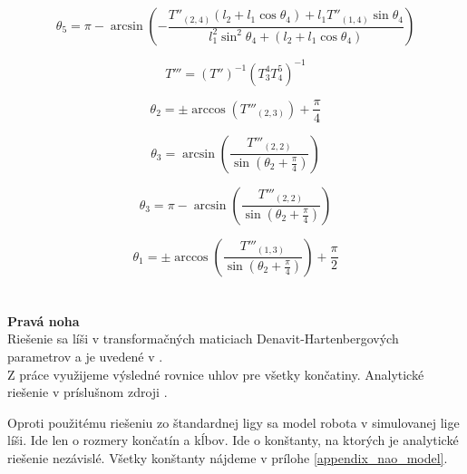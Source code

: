 \begin{equation}
	\theta_5 = \pi - \arcsin\left(-\frac{T''_{\left(2,4\right)} \left(l_2 + l_1\cos\theta_4\right) + l_1T''_{\left(1,4\right)}\sin\theta_4 } {l_1^2\sin^2 \theta_4 + \left(l_2 + l_1\cos\theta_4\right) }\right)
\end{equation}

$$T''' = \left(T''\right)^{-1} \left(T_3^4 T_4^5\right)^{-1}$$

\begin{equation}
	\theta_2 = \pm \arccos\left(T'''_{\left(2,3\right)}\right) + \frac{\pi}{4}
\end{equation}

\begin{equation}
	\theta_3 = \arcsin\left(\frac{T'''_{\left(2,2\right)}}{\sin\left(\theta_2 + \frac{\pi}{4}\right)}\right)
\end{equation}

\begin{equation}
	\theta_3 = \pi - \arcsin\left(\frac{T'''_{\left(2,2\right)}}{\sin\left(\theta_2 + \frac{\pi}{4}\right)}\right)
\end{equation}

\begin{equation}
	\theta_1 = \pm \arccos\left(\frac{T'''_{\left(1,3\right)}}{\sin\left(\theta_2 + \frac{\pi}{4}\right)}\right) + \frac{\pi}{2}
\end{equation}
\\\\
\textbf{Pravá noha} \\
Riešenie sa líši v transformačných maticiach Denavit-Hartenbergových parametrov a je uvedené v \cite{kofinas_master}.
\\

Z práce využijeme výsledné rovnice uhlov pre všetky končatiny. Analytické riešenie v príslušnom zdroji \cite{kofinas, kofinas_master}.

Oproti použitému riešeniu zo štandardnej ligy sa model robota v simulovanej lige líši. Ide len o rozmery končatín a kĺbov. Ide o konštanty, na ktorých je analytické riešenie nezávislé. Všetky konštanty nájdeme v prílohe  \ref{appendix_nao_model}.